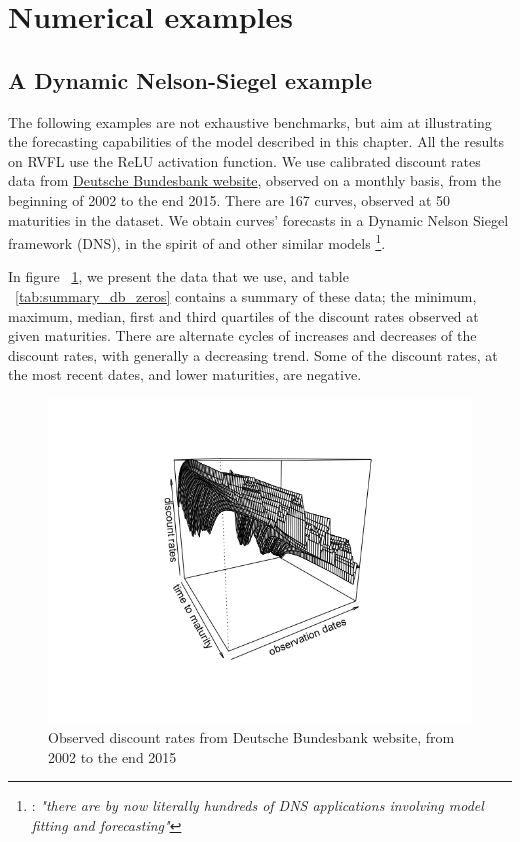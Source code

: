 \section{Numerical examples}
\label{sec:numericalexamples}

\subsection{A Dynamic Nelson-Siegel example}
\label{section:dnsexample1}

The following examples are not exhaustive benchmarks, but aim at illustrating the forecasting capabilities of the model described in this chapter. All the results on RVFL use the ReLU activation function. We use calibrated discount rates data from \href{http://www.bundesbank.de/Navigation/EN/Statistics/Time_series_databases/time_series_databases.html}{Deutsche Bundesbank website}, observed on a monthly basis, from the beginning of 2002 to the end 2015. There are 167 curves, observed at 50 maturities in the dataset. We obtain curves' forecasts in a Dynamic Nelson Siegel \cite{nelson1987parsimonious} framework (DNS), in the spirit of \cite{diebold2006forecasting} and other similar models \footnote{\cite{diebold2013yield}: \textit{"there are by now literally hundreds of DNS applications involving model fitting and forecasting"}}.

\medskip

In figure ~\ref{db_zerorates}, we present the data that we use, and table ~\ref{tab:summary_db_zeros} contains a summary of these data; the minimum, maximum, median, first and third quartiles of the discount rates observed at given maturities. There are alternate cycles of increases and decreases of the discount rates, with generally a decreasing trend. Some of the discount rates, at the most recent dates, and lower maturities, are negative.

\begin{figure}[!htb]
\centering
\includegraphics[width=14cm]{gfx/chapter-rvfl-mts/bundesbank_dR.png}
\caption{Observed discount rates from Deutsche Bundesbank website, from 2002 to the end 2015}
\label{db_zerorates}
\end{figure}

